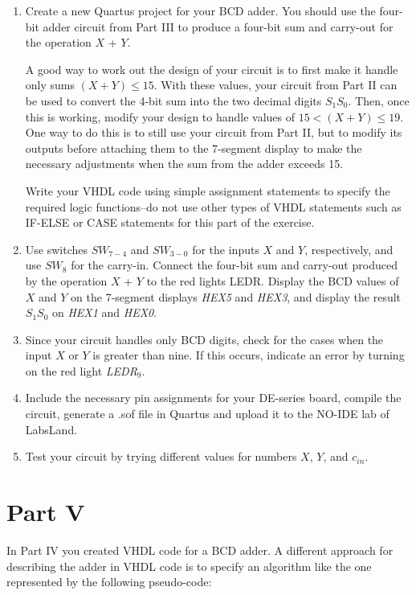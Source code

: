 \documentclass[epsfig,10pt,fullpage]{article}
\begin{document}
\begin{enumerate}
\item Create a new Quartus project for your BCD adder. You should use the
four-bit adder circuit from Part III to produce a four-bit sum and carry-out for the
operation $X$ + $Y$. 

A good way to work out the design of your circuit is to first make it handle only sums
$(X + Y) \le 15$. With these values, your circuit from Part II can be used to convert the
4-bit sum into the two decimal digits $S_1 S_0$.  Then, once this is working, modify 
your design to handle values of $15 < (X + Y) \le 19$. One way to do this is to still use 
your circuit from Part II, but to modify its outputs before attaching them to the 7-segment 
display to make the necessary adjustments when the sum from the adder exceeds 15.

Write your VHDL code using
simple assignment statements to specify the required logic functions--do not use 
other types of VHDL
statements such as IF-ELSE or CASE statements for this part of the exercise.
\item Use switches $SW_{7-4}$ and $SW_{3-0}$ for the inputs $X$ and $Y$, respectively, and
use $SW_{8}$ for the carry-in. Connect the four-bit sum and carry-out produced 
by the operation $X$ + $Y$ to the red lights LEDR. Display the BCD values of $X$
and $Y$ on the 7-segment displays {\it HEX5} and {\it HEX3}, and display the result $S_1 S_0$ on
{\it HEX1} and {\it HEX0}.
\item Since your circuit handles only BCD digits, check for the cases when the input 
$X$ or $Y$ is greater than nine. If this occurs, indicate an error by turning on 
the red light {\it LEDR}$_9$.
\item Include the necessary pin assignments for your DE-series board, compile the circuit, generate a .sof file in Quartus and upload it to the NO-IDE lab of LabsLand.
\item Test your circuit by trying different values for numbers $X$, $Y$, and $c_{in}$.
\end{enumerate}

\section*{Part V}
In Part IV you created VHDL code for a BCD adder. A different approach for describing
the adder in VHDL code is to specify an algorithm like the one
represented by the following pseudo-code:
\end{document}
